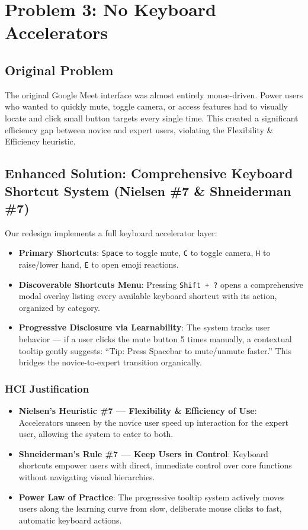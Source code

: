 \documentclass[12pt,a4paper]{article}
\begin{document}
\section{Problem 3: No Keyboard Accelerators}

\subsection{Original Problem}
The original Google Meet interface was almost entirely mouse-driven. Power users who wanted to quickly mute, toggle camera, or access features had to visually locate and click small button targets every single time. This created a significant efficiency gap between novice and expert users, violating the Flexibility \& Efficiency heuristic.

\subsection{Enhanced Solution: Comprehensive Keyboard Shortcut System (Nielsen \#7 \& Shneiderman \#7)}
Our redesign implements a full keyboard accelerator layer:
\begin{itemize}
    \item \textbf{Primary Shortcuts}: \texttt{Space} to toggle mute, \texttt{C} to toggle camera, \texttt{H} to raise/lower hand, \texttt{E} to open emoji reactions.
    \item \textbf{Discoverable Shortcuts Menu}: Pressing \texttt{Shift + ?} opens a comprehensive modal overlay listing every available keyboard shortcut with its action, organized by category.
    \item \textbf{Progressive Disclosure via Learnability}: The system tracks user behavior — if a user clicks the mute button 5 times manually, a contextual tooltip gently suggests: ``Tip: Press Spacebar to mute/unmute faster.'' This bridges the novice-to-expert transition organically.
\end{itemize}

\subsubsection{HCI Justification}
\begin{itemize}
    \item \textbf{Nielsen's Heuristic \#7 — Flexibility \& Efficiency of Use}: Accelerators unseen by the novice user speed up interaction for the expert user, allowing the system to cater to both.
    \item \textbf{Shneiderman's Rule \#7 — Keep Users in Control}: Keyboard shortcuts empower users with direct, immediate control over core functions without navigating visual hierarchies.
    \item \textbf{Power Law of Practice}: The progressive tooltip system actively moves users along the learning curve from slow, deliberate mouse clicks to fast, automatic keyboard actions.
\end{itemize}
\end{document}
